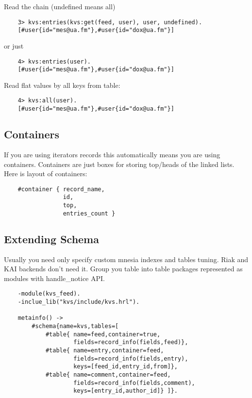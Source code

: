 Read the chain (undefined means all)

\begin{lstlisting}
    3> kvs:entries(kvs:get(feed, user), user, undefined).
    [#user{id="mes@ua.fm"},#user{id="dox@ua.fm"}]
\end{lstlisting}

or just

\begin{lstlisting}
    4> kvs:entries(user).
    [#user{id="mes@ua.fm"},#user{id="dox@ua.fm"}]
\end{lstlisting}

Read flat values by all keys from table:

\begin{lstlisting}
    4> kvs:all(user).
    [#user{id="mes@ua.fm"},#user{id="dox@ua.fm"}]
\end{lstlisting}

\subsection{Containers}

If you are using iterators records this automatically
means you are using containers. Containers are just boxes
for storing top/heads of the linked lists. Here is layout
of containers:

\begin{lstlisting}
    #container { record_name,
                 id,
                 top,
                 entries_count }
\end{lstlisting}

\subsection{Extending Schema}

Usually you need only specify custom mnesia indexes and tables tuning.
Riak and KAI backends don't need it. Group you table into table packages
represented as modules with handle\_notice API.

\begin{lstlisting}
    -module(kvs_feed).
    -inclue_lib("kvs/include/kvs.hrl").

    metainfo() -> 
        #schema{name=kvs,tables=[
            #table{ name=feed,container=true,
                    fields=record_info(fields,feed)},
            #table{ name=entry,container=feed,
                    fields=record_info(fields,entry),
                    keys=[feed_id,entry_id,from]},
            #table{ name=comment,container=feed,
                    fields=record_info(fields,comment),
                    keys=[entry_id,author_id]} ]}.
\end{lstlisting}

